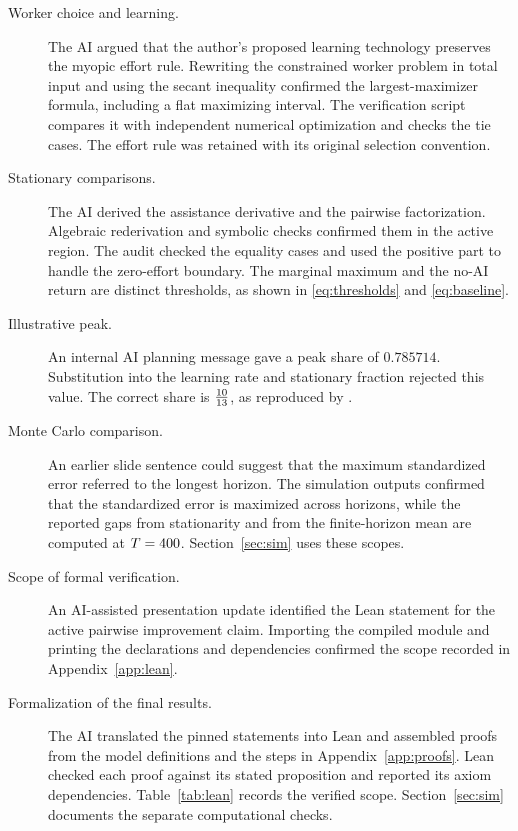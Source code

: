 \documentclass[11pt]{article}
\theoremstyle{definition}
\begin{document}
\begin{description}
\item[Worker choice and learning.]
The AI argued that the author's proposed learning technology preserves
the myopic effort rule. Rewriting the constrained worker problem in total input
and using the secant inequality confirmed the largest-maximizer formula,
including a flat maximizing interval. The verification script compares it
with independent numerical optimization and checks the tie cases.
The effort rule was retained with its original selection convention.

\item[Stationary comparisons.]
The AI derived the assistance derivative and the pairwise factorization.
Algebraic rederivation and symbolic checks confirmed them in the active
region. The audit checked the equality cases and used the positive part
to handle the zero-effort boundary. The marginal maximum and the no-AI
return are distinct thresholds, as shown in
\eqref{eq:thresholds} and \eqref{eq:baseline}.

\item[Illustrative peak.]
An internal AI planning message gave a peak share of $0.785714$.
Substitution into the learning rate and stationary fraction rejected this
value. The correct share is $\frac{10}{13}$, as reproduced by
.

\item[Monte Carlo comparison.]
An earlier slide sentence could suggest that the maximum standardized
error referred to the longest horizon. The simulation outputs confirmed
that the standardized error is maximized across horizons, while the
reported gaps from stationarity and from the finite-horizon mean are
computed at $T=400$. Section~\ref{sec:sim} uses these scopes.

\item[Scope of formal verification.]
An AI-assisted presentation update identified the Lean statement for the
active pairwise improvement claim. Importing the compiled module and
printing the declarations and dependencies confirmed the scope recorded
in Appendix~\ref{app:lean}.

\item[Formalization of the final results.]
The AI translated the pinned statements into Lean and assembled proofs
from the model definitions and the steps in Appendix~\ref{app:proofs}.
Lean checked each proof against its stated proposition and reported its
axiom dependencies. Table~\ref{tab:lean} records the verified scope.
Section~\ref{sec:sim} documents the separate computational checks.
\end{description}
\end{document}
